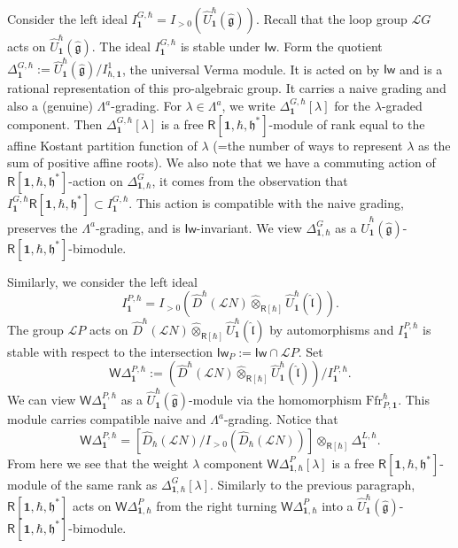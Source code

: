 \documentclass{amsart}
\theoremstyle{definition}
\newcommand{\Ring}{\mathsf{R}}
\newcommand{\g}{\mathfrak{g}}
\newcommand{\hg}{\hat{\mathfrak{g}}}
\newcommand{\h}{\mathfrak{h}}
\newcommand{\Loop}{\mathscr{L}}
\newcommand{\bone}{\mathbf{1}}
\newcommand{\hl}{\hat{\mathfrak{l}}}
\newcommand{\Iw}{\mathsf{Iw}}
\newcommand{\WakDelta}{\mathsf{W}\Delta}
\newcommand{\Ffr}{\mathrm{{Ffr}}}
\numberwithin{equation}{section}
\begin{document}
Consider the left ideal $I^{G,\hbar}_{\bone}=I_{>0}(\widehat{U}^\hbar_{\bone}(\hg))$. 
Recall that the loop group $\Loop G$ acts on $\widehat{U}_\bone^{\hbar}(\hg)$.
The ideal $I^{G,\hbar}_{\bone}$ is stable under $\mathsf{Iw}$. Form the quotient 
$\Delta^{G,\hbar}_{\bone}:=\widehat{U}_\bone^{\hbar}(\hg)/I^1_{\hbar,\bone}$, the universal Verma module. It is acted on by $\Iw$ and is a rational representation of this pro-algebraic group. 
It carries a naive grading and also a (genuine) $\Lambda^a$-grading. 
For $\lambda\in \Lambda^a$, we write $\Delta^{G,\hbar}_{\bone}[\lambda]$ for the $\lambda$-graded component. Then $\Delta^{G,\hbar}_{\bone}[\lambda]$  is a free $\Ring[\bone,\hbar,\h^*]$-module 
of rank equal to the affine Kostant partition function of $\lambda$
(=the number of ways to represent $\lambda$ as the sum of positive affine roots). We also note that we have a commuting action of $\Ring[\bone,\hbar,\h^*]$-action on $\Delta^{G}_{\bone,\hbar}$, it comes from the observation that $I^{G,\hbar}_{\bone}\Ring[\bone,\hbar,\h^*]\subset I^{G,\hbar}_{\bone}$. This action is compatible with the naive grading, preserves the $\Lambda^a$-grading, and is $\Iw$-invariant. We view $\Delta_{\bone,\hbar}^G$ as a $\widehat{U}_{\bone}^\hbar(\hat{\g})$-$\Ring[\bone,\hbar,\h^*]$-bimodule.

Similarly, we consider the left ideal $$I^{P,\hbar}_{\bone}=I_{>0}(\widehat{D}^\hbar(\Loop N)\widehat{\otimes}_{\Ring[\hbar]}\widehat{U}_\bone^{\hbar}(\hl)).$$
The group $\Loop P$ acts on $\widehat{D}^\hbar(\Loop N)\widehat{\otimes}_{\Ring[\hbar]}\widehat{U}_\bone^{\hbar}(\hl)$ by automorphisms 
and $I^{P,\hbar}_{\bone}$ is stable with respect to the intersection 
$\Iw_P:=\Iw\cap \Loop P$. Set
$$\WakDelta^{P,\hbar}_{\bone}:=(\widehat{D}^\hbar(\Loop N)\widehat{\otimes}_{\Ring[\hbar]}\widehat{U}_\bone^{\hbar}(\hl))/I^{P,\hbar}_{\bone}.$$
We can view $\WakDelta^{P,\hbar}_{\bone}$ as a $\widehat{U}^\hbar_{\bone}(\hg)$-module via the homomorphism $\Ffr^\hbar_{P,\bone}$.
This module carries compatible naive and $\Lambda^a$-grading.
Notice that 
$$\WakDelta^{P,\hbar}_{\bone}=[\widehat{D}_\hbar(\Loop N)/I_{>0}(\widehat{D}_\hbar(\Loop N))]\otimes_{\Ring[\hbar]}\Delta_{\bone}^{L,\hbar}.$$
From here we see that the weight $\lambda$ component $\WakDelta^P_{\bone,\hbar}[\lambda]$ is a free $\Ring[\bone,\hbar,\h^*]$-module of the same rank as 
$\Delta^{G}_{\bone,\hbar}[\lambda]$. Similarly to the previous paragraph,
$\Ring[\bone,\hbar,\h^*]$ acts on $\WakDelta^P_{\bone,\hbar}$
from the right turning $\WakDelta^P_{\bone,\hbar}$ into a $\widehat{U}^\hbar_{\bone}(\hat{\g})$-$\Ring[\bone,\hbar,\h^*]$-bimodule. 
\end{document}
